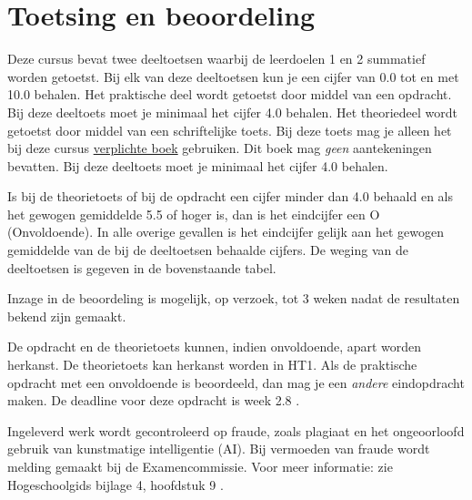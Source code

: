 \section{Toetsing en beoordeling}
\label{sec:toetsing}
Deze cursus bevat twee deeltoetsen waarbij de leerdoelen 1 en 2 summatief worden getoetst.
Bij elk van deze deeltoetsen kun je een cijfer van 0.0 tot en met 10.0 behalen.
Het praktische deel wordt getoetst door middel van een opdracht.
Bij deze deeltoets moet je minimaal het cijfer 4.0 behalen.
Het theoriedeel wordt getoetst door middel van een schriftelijke toets.
Bij deze toets mag je alleen het bij deze cursus \hyperref[sec:verplichteliteratuur]{verplichte boek} gebruiken.
Dit boek mag \emph{geen} aantekeningen bevatten.
Bij deze deeltoets moet je minimaal het cijfer 4.0 behalen.


Is bij de theorietoets of bij de opdracht een cijfer minder dan 4.0 behaald en als het gewogen gemiddelde 5.5 of hoger is, dan is het eindcijfer een O (Onvoldoende).
In alle overige gevallen is het eindcijfer gelijk aan het gewogen gemiddelde van de bij de deeltoetsen behaalde cijfers.
De weging van de deeltoetsen is gegeven in de bovenstaande tabel.

Inzage in de beoordeling is mogelijk, op verzoek, tot 3 weken nadat de resultaten bekend zijn gemaakt.

De opdracht en de theorietoets kunnen, indien onvoldoende, apart worden herkanst.
De theorietoets kan herkanst worden in HT1.
Als de praktische opdracht met een onvoldoende is beoordeeld, dan mag je een \emph{andere} eindopdracht maken. De deadline voor deze opdracht is week 2.8 \deadline{}.

Ingeleverd werk wordt gecontroleerd op fraude, zoals plagiaat en het ongeoorloofd gebruik van kunstmatige intelligentie (AI).
Bij vermoeden van fraude wordt melding gemaakt bij de Examencommissie. 
Voor meer informatie: zie Hogeschoolgids bijlage 4, hoofdstuk 9 .

